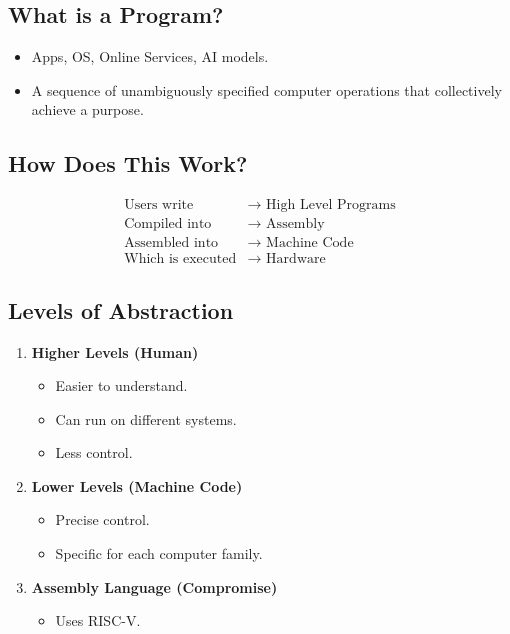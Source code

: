 \documentclass{article}
\begin{document}
\subsection*{What is a Program?}
\begin{itemize}
    \item Apps, OS, Online Services, AI models.
    \item A sequence of unambiguously specified computer operations that collectively achieve a purpose.
\end{itemize}

\subsection*{How Does This Work?}
\begin{align*}
    \text{Users write} &\rightarrow \text{ High Level Programs} \\
    \text{Compiled into} &\rightarrow \text{ Assembly} \\
    \text{Assembled into} &\rightarrow \text{ Machine Code} \\
    \text{Which is executed} &\rightarrow \text{ Hardware}
\end{align*}

\subsection*{Levels of Abstraction}
\begin{enumerate}
    \item \textbf{Higher Levels (Human)}
    \begin{itemize}
        \item Easier to understand.
        \item Can run on different systems.
        \item Less control.
    \end{itemize}

    \item \textbf{Lower Levels (Machine Code)}
    \begin{itemize}
        \item Precise control.
        \item Specific for each computer family.
    \end{itemize}

    \item \textbf{Assembly Language (Compromise)}
    \begin{itemize}
        \item Uses RISC-V.
    \end{itemize}
\end{enumerate}
\end{document}

